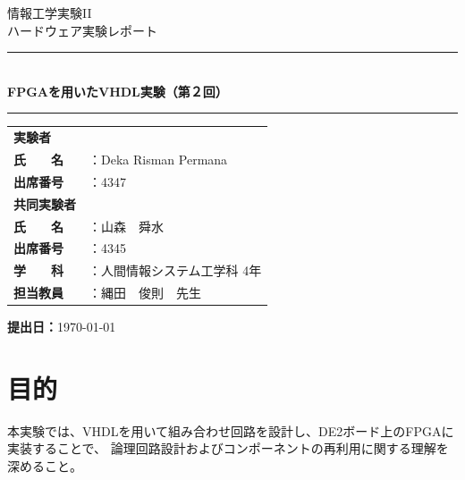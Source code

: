 \documentclass[12pt,a4paper]{ltjsarticle}
\title{}
\date{}
\author{}
\newcommand{\HRule}{\rule{\linewidth}{0.5mm}}
\begin{document}

\begin{titlepage}
  \thispagestyle{titlepage}
  \centering
  \vspace*{2cm}

  {\large 情報工学実験II}\\[0.5em]
  {\large ハードウェア実験レポート}\\[2em]

  \HRule{}\\[1em]
  {\LARGE \textbf{FPGAを用いたVHDL実験（第２回）}}\\[0.5em]
  \HRule{}

  \vspace{3cm}

  \begin{tabular}{ll}
    \textbf{実験者} & \\[0.8em]
    \textbf{氏　　名} & ：Deka Risman Permana \\[0.4em]
    \textbf{出席番号} & ：4347 \\[1.2em]

    \textbf{共同実験者} & \\[0.8em]
    \textbf{氏　　名} & ：山森　舜水 \\[0.4em]
    \textbf{出席番号} & ：4345 \\[1.2em]

    \textbf{学　　科} & ：人間情報システム工学科 4年 \\[0.4em]
    \textbf{担当教員} & ：縄田　俊則　先生 \\
  \end{tabular}

  \vfill

  \textbf{提出日：}\today

\end{titlepage}

\newpage
\thispagestyle{frontmatter}
\tableofcontents

\newpage
{}
\setcounter{page}{1}

\section{目的}

本実験では、VHDLを用いて組み合わせ回路を設計し、DE2ボード上のFPGAに実装することで、
論理回路設計およびコンポーネントの再利用に関する理解を深めること。
\end{document}
